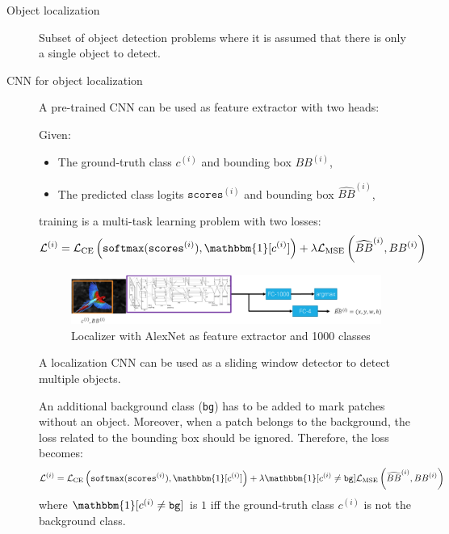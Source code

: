 \begin{description}
    \item[Object localization] 
        Subset of object detection problems where it is assumed that there is only a single object to detect.

    \item[CNN for object localization] 
        A pre-trained CNN can be used as feature extractor with two heads:

        Given:
        \begin{itemize}
            \item The ground-truth class $c^{(i)}$ and bounding box $BB^{(i)}$,
            \item The predicted class logits $\texttt{scores}^{(i)}$ and bounding box $\widehat{BB}^{(i)}$,
        \end{itemize} 
        training is a multi-task learning problem with two losses:
        \[ \mathcal{L}^{(i)} = \mathcal{L}_\text{CE}\left( \texttt{softmax}(\texttt{scores}^{(i)}), \mathbbm{1}[c^{(i)}] \right) + \lambda \mathcal{L}_\text{MSE}\left(\widehat{BB}^{(i)}, BB^{(i)} \right) \]

        \begin{figure}[H]
            \centering
            \includegraphics[width=0.9\linewidth]{./img/_cnn_object_localization.pdf}
            \caption{Localizer with AlexNet as feature extractor and 1000 classes}
        \end{figure}

        \begin{remark}
            A localization CNN can be used as a sliding window detector to detect multiple objects.

            An additional background class (\texttt{bg}) has to be added to mark patches without an object. Moreover, when a patch belongs to the background, the loss related to the bounding box should be ignored. Therefore, the loss becomes:
            \[ \mathcal{L}^{(i)} = \mathcal{L}_\text{CE}\left( \texttt{softmax}(\texttt{scores}^{(i)}), \mathbbm{1}[c^{(i)}] \right) + \lambda \mathbbm{1}[c^{(i)} \neq \texttt{bg}] \mathcal{L}_\text{MSE}\left(\widehat{BB}^{(i)}, BB^{(i)} \right) \]
            where $\mathbbm{1}[c^{(i)} \neq \texttt{bg}]$ is $1$ iff the ground-truth class $c^{(i)}$ is not the background class.


\end{remark}
\end{description}
